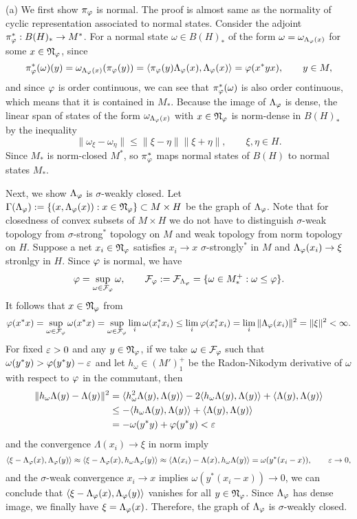 \documentclass{../../large}
\begin{document}
\begin{pf}
(a)
We first show $\pi_\varphi$ is normal.
The proof is almost same as the normality of cyclic representation associated to normal states.
Consider the adjoint $\pi_\varphi^*:B(H)_*\to M^*$.
For a normal state $\omega\in B(H)_*$ of the form $\omega=\omega_{\Lambda_\varphi(x)}$ for some $x\in\mathfrak{N}_\varphi$, since
\[\pi_\varphi^*(\omega)(y)=\omega_{\Lambda_\varphi(x)}(\pi_\varphi(y))=\langle\pi_\varphi(y)\Lambda_\varphi(x),\Lambda_\varphi(x)\rangle=\varphi(x^*yx),\qquad y\in M,\]
and since $\varphi$ is order continuous, we can see that $\pi_\varphi^*(\omega)$ is also order continuous, which means that it is contained in $M_*$.
Because the image of $\Lambda_\varphi$ is dense, the linear span of states of the form $\omega_{\Lambda_\varphi(x)}$ with $x\in\mathfrak{N}_\varphi$ is norm-dense in $B(H)_*$ by the inequality
\[\|\omega_\xi-\omega_\eta\|\le\|\xi-\eta\|\|\xi+\eta\|,\qquad\xi,\eta\in H.\]
Since $M_*$ is norm-closed $M^*$, so $\pi_\varphi^*$ maps normal states of $B(H)$ to normal states $M_*$.

Next, we show $\Lambda_\varphi$ is $\sigma$-weakly closed.
Let $\Gamma(\Lambda_\varphi):=\{(x,\Lambda_\varphi(x)):x\in\mathfrak{N}_\varphi\}\subset M\times H$ be the graph of $\Lambda_\varphi$.
Note that for closedness of convex subsets of $M\times H$ we do not have to distinguish $\sigma$-weak topology from $\sigma$-strong$^*$ topology on $M$ and weak topology from norm topology on $H$.
Suppose a net $x_i\in\mathfrak{N}_\varphi$ satisfies $x_i\to x$ $\sigma$-strongly$^*$ in $M$ and $\Lambda_\varphi(x_i)\to\xi$ stronlgy in $H$.
Since $\varphi$ is normal, we have
\[\varphi=\sup_{\omega\in\mathcal{F}_\varphi}\omega,\qquad\mathcal{F}_\varphi:=\mathcal{F}_{\Lambda_\varphi}=\{\omega\in M_*^+:\omega\le\varphi\}.\]
It follows that $x\in\mathfrak{N}_\varphi$ from
\[\varphi(x^*x)=\sup_{\omega\in\mathcal{F}_\varphi}\omega(x^*x)=\sup_{\omega\in\mathcal{F}_\varphi}\lim_i\omega(x_i^*x_i)\le\lim_i\varphi(x_i^*x_i)=\lim_i\|\Lambda_\varphi(x_i)\|^2=\|\xi\|^2<\infty.\]
For fixed $\varepsilon>0$ and any $y\in\mathfrak{N}_\varphi$, if we take $\omega\in\mathcal{F}_\varphi$ such that $\omega(y^*y)>\varphi(y^*y)-\varepsilon$ and let $h_\omega\in(M')_1^+$ be the Radon-Nikodym derivative of $\omega$ with respect to $\varphi$ in the commutant, then
\begin{align*}
\|h_\omega\Lambda(y)-\Lambda(y)\|^2
&=\langle h_\omega^2\Lambda(y),\Lambda(y)\rangle-2\langle h_\omega\Lambda(y),\Lambda(y)\rangle+\langle\Lambda(y),\Lambda(y)\rangle\\
&\le-\langle h_\omega\Lambda(y),\Lambda(y)\rangle+\langle\Lambda(y),\Lambda(y)\rangle\\
&=-\omega(y^*y)+\varphi(y^*y)<\varepsilon
\end{align*}
and the convergence $\Lambda(x_i)\to\xi$ in norm imply
\[\langle\xi-\Lambda_\varphi(x),\Lambda_\varphi(y)\rangle\approx\langle\xi-\Lambda_\varphi(x),h_\omega\Lambda_\varphi(y)\rangle\approx\langle\Lambda(x_i)-\Lambda(x),h_\omega\Lambda(y)\rangle=\omega(y^*(x_i-x)),\qquad\varepsilon\to0,\]
and the $\sigma$-weak convergence $x_i\to x$ implies $\omega(y^*(x_i-x))\to0$, we can conclude that $\langle\xi-\Lambda_\varphi(x),\Lambda_\varphi(y)\rangle$ vanishes for all $y\in\mathfrak{N}_\varphi$.
Since $\Lambda_\varphi$ has dense image, we finally have $\xi=\Lambda_\varphi(x)$.
Therefore, the graph of $\Lambda_\varphi$ is $\sigma$-weakly closed.


\end{pf}
\end{document}
